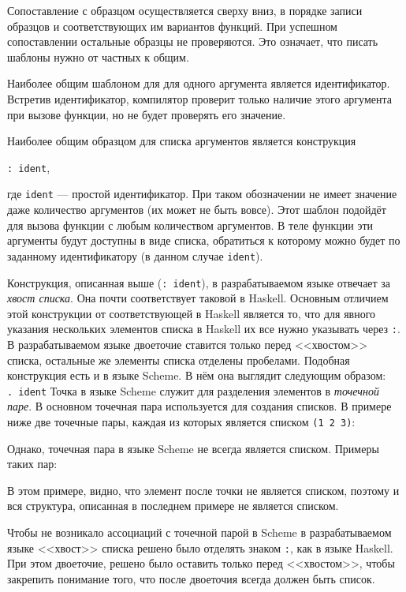         Сопоставление с образцом осуществляется сверху вниз, в порядке записи образцов и соответствующих им вариантов функций.
        При успешном сопоставлении остальные образцы не проверяются.
        Это означает, что писать шаблоны нужно от частных к общим.

        Наиболее общим шаблоном для для одного аргумента является идентификатор.
        Встретив идентификатор, компилятор проверит только наличие этого аргумента при вызове функции, но не будет проверять его значение.

        Наиболее общим образцом для списка аргументов является конструкция

        \verb!: ident!,

        где \verb!ident! --- простой идентификатор.
        При таком обозначении не имеет значение даже количество аргументов (их может не быть вовсе).
        Этот шаблон подойдёт для вызова функции с любым количеством аргументов.
        В теле функции эти аргументы будут доступны в виде списка, обратиться к которому можно будет по заданному идентификатору (в данном случае \verb!ident!).

        Конструкция, описанная выше (\verb!: ident!), в разрабатываемом языке отвечает за \textit{хвост списка}.
        Она почти соответствует таковой в Haskell.
        Основным отличием этой конструкции от соответствующей в Haskell является то, что для явного указания нескольких элементов списка в Haskell их все нужно указывать через \verb!:!.
        В разрабатываемом языке двоеточие ставится только перед <<хвостом>> списка, остальные же элементы списка отделены пробелами.
        Подобная конструкция есть и в языке Scheme.
        В нём она выглядит следующим образом:
        \\ \verb!. ident!
        Точка в языке Scheme служит для разделения элементов в \textit{точечной паре}.
        В основном точечная пара используется для создания списков.
        В примере ниже две точечные пары, каждая из которых является списком \verb$(1 2 3)$:
        

        Однако, точечная пара в языке Scheme не всегда является списком.
        Примеры таких пар:
        

        В этом примере, видно, что элемент после точки не является списком, поэтому и вся структура, описанная в последнем примере не является списком.

        Чтобы не возникало ассоциаций с точечной парой в Scheme в разрабатываемом языке <<хвост>> списка решено было отделять знаком \verb,:,, как в языке Haskell.
        При этом двоеточие, решено было оставить только перед <<хвостом>>, чтобы закрепить понимание того, что после двоеточия всегда должен быть список.

